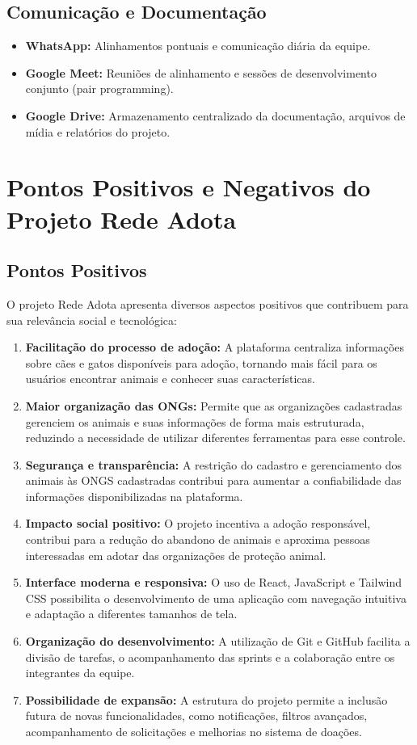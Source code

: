 \documentclass[12pt,a4paper]{article}
\begin{document}
\subsection*{Comunicação e Documentação}
\begin{itemize}[leftmargin=*]
    \item \textbf{WhatsApp:} Alinhamentos pontuais e comunicação diária da equipe.
    \item \textbf{Google Meet:} Reuniões de alinhamento e sessões de desenvolvimento conjunto (pair programming).
    \item \textbf{Google Drive:} Armazenamento centralizado da documentação, arquivos de mídia e relatórios do projeto.
\end{itemize}

\section{Pontos Positivos e Negativos do Projeto Rede Adota}

\subsection{Pontos Positivos}
O projeto Rede Adota apresenta diversos aspectos positivos que contribuem para sua relevância social e tecnológica:
\begin{enumerate}[leftmargin=*]
    \item \textbf{Facilitação do processo de adoção:} A plataforma centraliza informações sobre cães e gatos disponíveis para adoção, tornando mais fácil para os usuários encontrar animais e conhecer suas características.
    \item \textbf{Maior organização das ONGs:} Permite que as organizações cadastradas gerenciem os animais e suas informações de forma mais estruturada, reduzindo a necessidade de utilizar diferentes ferramentas para esse controle.
    \item \textbf{Segurança e transparência:} A restrição do cadastro e gerenciamento dos animais às ONGS cadastradas contribui para aumentar a confiabilidade das informações disponibilizadas na plataforma.
    \item \textbf{Impacto social positivo:} O projeto incentiva a adoção responsável, contribui para a redução do abandono de animais e aproxima pessoas interessadas em adotar das organizações de proteção animal.
    \item \textbf{Interface moderna e responsiva:} O uso de React, JavaScript e Tailwind CSS possibilita o desenvolvimento de uma aplicação com navegação intuitiva e adaptação a diferentes tamanhos de tela.
    \item \textbf{Organização do desenvolvimento:} A utilização de Git e GitHub facilita a divisão de tarefas, o acompanhamento das sprints e a colaboração entre os integrantes da equipe.
    \item \textbf{Possibilidade de expansão:} A estrutura do projeto permite a inclusão futura de novas funcionalidades, como notificações, filtros avançados, acompanhamento de solicitações e melhorias no sistema de doações.
\end{enumerate}
\end{document}

